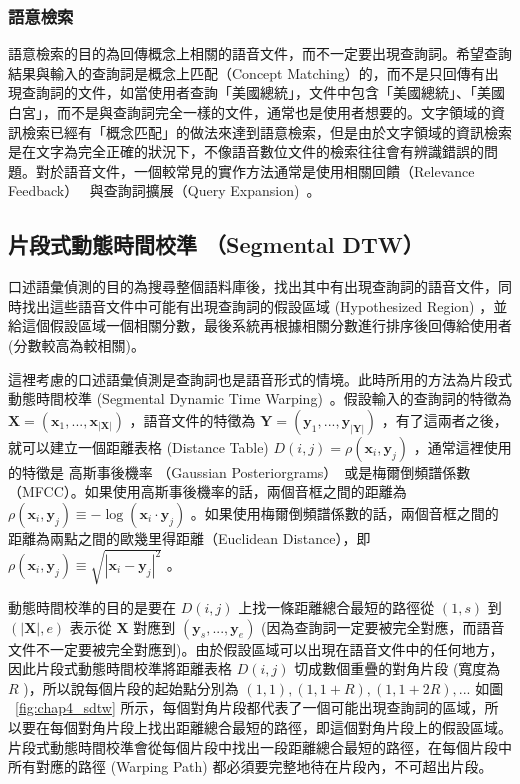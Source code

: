 \subsubsection{語意檢索}
語意檢索的目的為回傳概念上相關的語音文件，而不一定要出現查詢詞。希望查詢結果與輸入的查詢詞是概念上匹配（Concept
Matching）的，而不是只回傳有出現查詢詞的文件，如當使用者查詢「美國總統」，文件中包含「美國總統」、「美國白宮」，而不是與查詢詞完全一樣的文件，通常也是使用者想要的。文字領域的資訊檢索已經有「概念匹配」的做法來達到語意檢索，但是由於文字領域的資訊檢索是在文字為完全正確的狀況下，不像語音數位文件的檢索往往會有辨識錯誤的問題。對於語音文件，一個較常見的實作方法通常是使用相關回饋（Relevance Feedback）~\cite{ruthven2003survey} 與查詢詞擴展（Query Expansion)~\cite{voorhees1994query,xu1996query}。

\subsection{片段式動態時間校準 （Segmental DTW）}
\label{sec:chap4_sdtw}
口述語彙偵測的目的為搜尋整個語料庫後，找出其中有出現查詢詞的語音文件，同時找出這些語音文件中可能有出現查詢詞的假設區域 (Hypothesized Region) ，並給這個假設區域一個相關分數，最後系統再根據相關分數進行排序後回傳給使用者 (分數較高為較相關)。

這裡考慮的口述語彙偵測是查詢詞也是語音形式的情境。此時所用的方法為片段式動態時間校準 (Segmental Dynamic Time Warping)~\cite{chan2010unsupervised, hazen2009query}。假設輸入的查詢詞的特徵為 $ \mathbf{X} = (\mathbf{x}_1, ..., \mathbf{x}_{|\mathbf{X}|}) $ ，語音文件的特徵為 $ \mathbf{Y} = (\mathbf{y}_1, ..., \mathbf{y}_{|\mathbf{Y}|}) $ ，有了這兩者之後，就可以建立一個距離表格 (Distance Table)  $ D(i, j) = \rho(\mathbf{x}_i, \mathbf{y}_j) $ ，通常這裡使用的特徵是
高斯事後機率 （Gaussian Posteriorgrams）~\cite{zhang2009unsupervised}或是梅爾倒頻譜係數
（MFCC）。如果使用高斯事後機率的話，兩個音框之間的距離為
 $ \rho(\mathbf{x}_i, \mathbf{y}_j) \equiv -\log (\mathbf{x}_i
\cdot\mathbf{y}_j) $ 。如果使用梅爾倒頻譜係數的話，兩個音框之間的距離為兩點之間的歐幾里得距離（Euclidean
Distance），即 $ \rho(\mathbf{x}_i, \mathbf{y}_j)
\equiv\sqrt{|\mathbf{x}_i - \mathbf{y}_j|^2} $ 。

動態時間校準的目的是要在  $ D(i, j) $  上找一條距離總合最短的路徑從  $ (1, s) $  到  $ (|\mathbf{X}|, e) $  表示從  $ \mathbf{X} $ 對應到 $ (\mathbf{y}_s, ..., \mathbf{y}_e) $  (因為查詢詞一定要被完全對應，而語音文件不一定要被完全對應到)。由於假設區域可以出現在語音文件中的任何地方， 因此片段式動態時間校準將距離表格  $ D(i, j) $  切成數個重疊的對角片段 (寬度為  $ R $ )，所以說每個片段的起始點分別為  $ (1, 1), (1, 1+R), (1, 1+2R),... $  如圖 ~\ref{fig:chap4_sdtw} 所示，每個對角片段都代表了一個可能出現查詢詞的區域，所以要在每個對角片段上找出距離總合最短的路徑，即這個對角片段上的假設區域。片段式動態時間校準會從每個片段中找出一段距離總合最短的路徑，在每個片段中所有對應的路徑 (Warping Path) 都必須要完整地待在片段內，不可超出片段。

